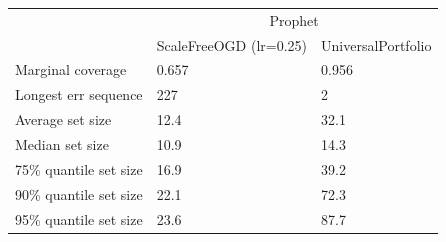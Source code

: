\begin{tabular}{lll}
\toprule
& \multicolumn{2}{c}{Prophet} \\
& ScaleFreeOGD (lr=0.25) & UniversalPortfolio \\
\midrule
Marginal coverage & 0.657 & 0.956 \\
Longest err sequence & 227 & 2 \\
Average set size & 12.4 & 32.1 \\
Median set size & 10.9 & 14.3 \\
75\% quantile set size & 16.9 & 39.2 \\
90\% quantile set size & 22.1 & 72.3 \\
95\% quantile set size & 23.6 & 87.7 \\
\bottomrule
\end{tabular}
